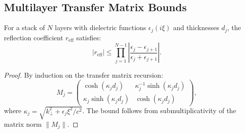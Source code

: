 \documentclass{article}
\begin{document}
\subsection{Multilayer Transfer Matrix Bounds}
For a stack of \(N\) layers with dielectric functions \(\epsilon_j(i\xi)\) and thicknesses \(d_j\), the reflection coefficient \(r_\text{eff}\) satisfies:
\[
|r_\text{eff}| \leq \prod_{j=1}^{N-1} \left| \frac{\epsilon_j - \epsilon_{j+1}}{\epsilon_j + \epsilon_{j+1}} \right|.
\]

\begin{proof}
By induction on the transfer matrix recursion:
\[
M_j = \begin{pmatrix}
\cosh(\kappa_j d_j) & \kappa_j^{-1} \sinh(\kappa_j d_j) \\
\kappa_j \sinh(\kappa_j d_j) & \cosh(\kappa_j d_j)
\end{pmatrix},
\]
where \(\kappa_j = \sqrt{k_{\perp}^2 + \epsilon_j \xi^2/c^2}\). The bound follows from submultiplicativity of the matrix norm \(\|M_j\|\).
\end{proof}

\nocite{*}


\end{document}
